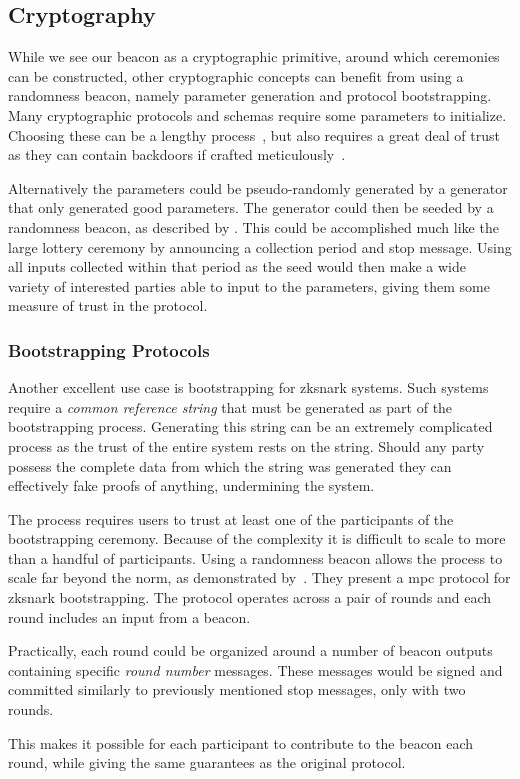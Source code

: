 \subsection{Cryptography}
While we see our beacon as a cryptographic primitive, around which ceremonies can be constructed, other cryptographic concepts can benefit from using a randomness beacon, namely parameter generation and protocol bootstrapping.
Many cryptographic protocols and schemas require some parameters to initialize.
Choosing these can be a lengthy process~\cite{mpcsnarks}, but also requires a great deal of trust as they can contain backdoors if crafted meticulously~\cite{nist2014backdoor}.

Alternatively the parameters could be pseudo-randomly generated by a generator that only generated good parameters.
The generator could then be seeded by a randomness beacon, as described by \citet{baigneres2015trap}.
This could be accomplished much like the large lottery ceremony by announcing a collection period and stop message.
Using all inputs collected within that period as the seed would then make a wide variety of interested parties able to input to the parameters, giving them some measure of trust in the protocol.

\subsubsection{Bootstrapping Protocols}%
\label{ssub:bootstrapping_protocols}
Another excellent use case is bootstrapping for \gls{zksnark} systems.
Such systems require a \emph{common reference string} that must be generated as part of the bootstrapping process.
Generating this string can be an extremely complicated process as the trust of the entire system rests on the string.
Should any party possess the complete data from which the string was generated they can effectively fake proofs of anything, undermining the system.

The process requires users to trust at least one of the participants of the bootstrapping ceremony.
Because of the complexity it is difficult to scale to more than a handful of participants.
Using a randomness beacon allows the process to scale far beyond the norm, as demonstrated by~\citet{mpcsnarks}.
They present a \acrshort{mpc} protocol for \acrshort{zksnark} bootstrapping.
The protocol operates across a pair of rounds and each round includes an input from a beacon. %

Practically, each round could be organized around a number of beacon outputs containing specific \textit{round number} messages.
These messages would be signed and committed similarly to previously mentioned stop messages, only with two rounds.

This makes it possible for each participant to contribute to the beacon each round, while giving the same guarantees as the original protocol.

